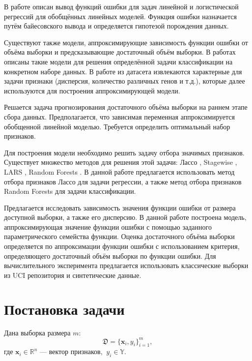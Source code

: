 \documentclass[12pt, a4paper]{scrartcl}
\theoremstyle{plain}
\theoremstyle{definition}
\begin{document}
В работе \cite{Strijov-2012} описан вывод функций ошибки для задач линейной и логистической регрессий для обобщённых линейных моделей. Функция ошибки назначается путём байесовского вывода и определяется гипотезой порождения данных.

Существуют также модели, аппроксимирующие зависимость функции ошибки от объёма выборки и предсказывающие достаточный объём выборки.  В работах \cite{Figueroa-2012, Dobbin-2008} описаны такие модели для решения определённой задачи классификации на конкретном наборе данных. В работе \cite{Dobbin-2008} из датасета извлекаются характерные для задачи признаки (дисперсия, количество различных генов и т.д.), которые далее используются для построения аппроксимирующей модели. 

Решается задача прогнозирования достаточного объёма выборки на раннем этапе сбора данных.  Предполагается, что зависимая переменная аппроксимируется обобщенной линейной моделью. Требуется определить оптимальный набор признаков.

Для построения модели необходимо решить задачу отбора значимых признаков. Существует множество методов для решения этой задачи: Лассо \cite{Tibshirani-1996}, Stagewise \cite{Hastie-2007}, LARS \cite{Efron-2004}, Random Forests \cite{Brieman-2001}. В данной работе предлагается использовать метод отбора признаков Лассо для задачи регрессии, а также метод отбора признаков Random Forests для задачи классификации. 

Предлагается исследовать зависимость значения функции ошибки от размера доступной выборки, а также его дисперсию. В данной работе построена модель, аппроксимирующая значение функции ошибки с помощью заданного параметрического семейства функции. Оценка достаточного объёма выборки определяется по аппроксимации функции ошибки с использованием критерия, определяющего достаточный объём выборки по функции ошибки. Для вычислительного эксперимента предлагается использовать классические выборки из UCI репозитория и синтетические данные.


\newpage
\section{Постановка задачи}

Дана выборка размера $m$:
$$
\mathfrak D = \{\mathbf{x}_i, y_i\}_{i=1}^m,
$$
где $\textbf{x}_i \in \mathbb{R}^{n}$ --- вектор признаков, $~y_i \in \mathbb{Y}$.
\end{document}
